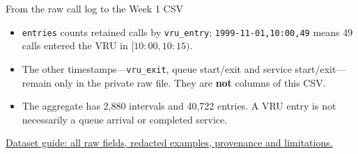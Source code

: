 \documentclass{beamer}
\begin{document}
\begin{frame}{From the raw call log to the Week 1 CSV}
  \centering

  \vspace{0.65em}
  \begin{itemize}
    \item \texttt{entries} counts retained calls by \texttt{vru\_entry}; \texttt{1999-11-01,10:00,49} means 49 calls entered the VRU in $[10{:}00,10{:}15)$.
    \item The other timestamps---\texttt{vru\_exit}, queue start/exit and service start/exit---remain only in the private raw file. They are \textbf{not} columns of this CSV.
    \item The aggregate has 2,880 intervals and 40,722 entries. A VRU entry is not necessarily a queue arrival or completed service.
  \end{itemize}

  \vspace{0.25em}
  \footnotesize
  \href{https://github.com/NaitsabesMue/stochastic-modeling-simulation-ds/blob/main/data/anonymousbank_data_guide.md}{Dataset guide: all raw fields, redacted examples, provenance and limitations.}
\end{frame}
\end{document}
